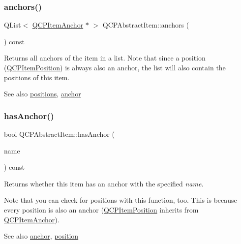\subsubsection{\texorpdfstring{anchors()}{anchors()}}
{\footnotesize\ttfamily Q\+List$<$ \hyperlink{classQCPItemAnchor}{Q\+C\+P\+Item\+Anchor} $\ast$ $>$ Q\+C\+P\+Abstract\+Item\+::anchors (\begin{DoxyParamCaption}{ }\end{DoxyParamCaption}) const\hspace{0.3cm}{\ttfamily [inline]}}

Returns all anchors of the item in a list. Note that since a position (\hyperlink{classQCPItemPosition}{Q\+C\+P\+Item\+Position}) is always also an anchor, the list will also contain the positions of this item.

\begin{DoxySeeAlso}{See also}
\hyperlink{classQCPAbstractItem_a709f655ac3f7f22d452714134662b454}{positions}, \hyperlink{classQCPAbstractItem_a139c255ea8831642fac91748e29a5adb}{anchor} 
\end{DoxySeeAlso}
\mbox{\label{classQCPAbstractItem_a84914f4516f9b38ef0bd89eafe3dbda7}} 
\subsubsection{\texorpdfstring{has\+Anchor()}{hasAnchor()}}
{\footnotesize\ttfamily bool Q\+C\+P\+Abstract\+Item\+::has\+Anchor (\begin{DoxyParamCaption}\item[{const Q\+String \&}]{name }\end{DoxyParamCaption}) const}

Returns whether this item has an anchor with the specified {\itshape name}.

Note that you can check for positions with this function, too. This is because every position is also an anchor (\hyperlink{classQCPItemPosition}{Q\+C\+P\+Item\+Position} inherits from \hyperlink{classQCPItemAnchor}{Q\+C\+P\+Item\+Anchor}).

\begin{DoxySeeAlso}{See also}
\hyperlink{classQCPAbstractItem_a139c255ea8831642fac91748e29a5adb}{anchor}, \hyperlink{classQCPAbstractItem_a2589c3d298f9a576d77d9addb440a18d}{position} 
\end{DoxySeeAlso}
\mbox{\label{classQCPAbstractItem_a2589c3d298f9a576d77d9addb440a18d}} 
